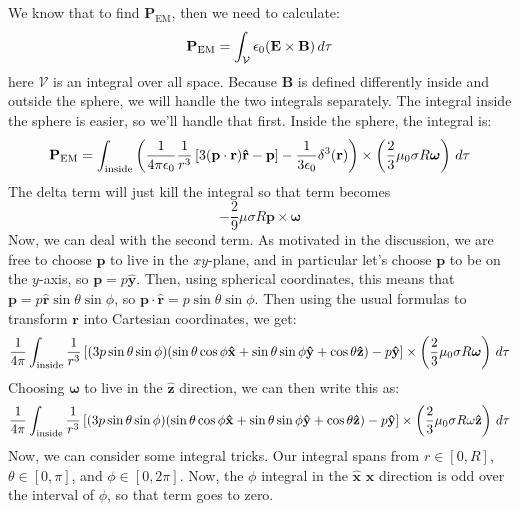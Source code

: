 \documentclass[10pt]{article}
\begin{document}
	\begin{solution}
		We know that to find \( \mathbf{P}_\text{EM} \), then we need to calculate:
		\[
			\mathbf{P}_\text{EM} = \int_\mathcal{V} \epsilon_0(\mathbf{E} \times \mathbf{B}) \,d \tau
		\]
		here \( \mathcal{V} \) is an integral over all space. Because \( \mathbf{B} \) is defined differently
		inside and outside the sphere, we will handle the two integrals separately. The integral inside the
		sphere is easier, so we'll handle that first. Inside the sphere, the integral is:
		\[
			\mathbf{P}_\text{EM} = \int_{\text{inside}} \left( \frac{1}{4 \pi \epsilon_0} \frac{1}{r^3}
			\left[ 3 (\mathbf{p} \cdot \mathbf{r}) \mathbf{\hat{r}} - \mathbf{p} \right] - \frac{1}{3
		\epsilon_0} \delta^3(\mathbf{r}) \right) \times \left( \frac{2}{3} \mu_0 \sigma R \boldsymbol{\omega} \right)
		\,d \tau 
		\]
		The delta term will just kill the integral so that term becomes
		\[
			-\frac{2}{9} \mu \sigma R \mathbf{p} \times \boldsymbol{\omega}
		\]
		Now, we can deal with the second term. As motivated in the discussion, we are free to choose \(
		\mathbf{p} \) to live in the \( xy \)-plane, and in particular let's choose \( \mathbf{p} \) to be on
		the \( y \)-axis, so \( \mathbf{p} = p \mathbf{\hat{y}} \). Then, using spherical coordinates, this
		means that \( \mathbf{p} = p \mathbf{\hat{r}} \sin \theta \sin \phi \), so \( \mathbf{p} \cdot
		\mathbf{\hat{r}} = p \sin \theta \sin \phi \). Then using the usual formulas to transform 
		\( \mathbf{r} \) into Cartesian coordinates, we get:
		\[
			\frac{1}{4\pi} \int_\text{inside} \frac{1}{r^3}\left[ (3 p \sin \theta \sin \phi) (\sin \theta
			\cos \phi \mathbf{\hat{x}} + \sin \theta \sin \phi \mathbf{\hat{y}} + \cos \theta
		\mathbf{\hat{z}}) - p \mathbf{\hat{y}} \right] \times \left( \frac{2}{3}\mu_0 \sigma R
	\boldsymbol{\omega} \right) \,d \tau 
		\]
		Choosing \( \boldsymbol{\omega} \) to live in the \( \mathbf{\hat{z}} \) direction, we can then write
		this as:
		\[
			\frac{1}{4\pi} \int_\text{inside} \frac{1}{r^3}\left[ (3 p \sin \theta \sin \phi) (\sin \theta
			\cos \phi \mathbf{\hat{x}} + \sin \theta \sin \phi \mathbf{\hat{y}} + \cos \theta
		\mathbf{\hat{z}}) - p \mathbf{\hat{y}} \right] \times \left( \frac{2}{3}\mu_0 \sigma R
	\omega \mathbf{\hat{z}}\right) \,d \tau 
		\]
		Now, we can consider some integral tricks. Our integral spans from \( r \in [0, R] \), \( \theta \in
		[0, \pi]\), and \( \phi \in [0, 2\pi] \). Now, the \( \phi \) integral in the \( \mathbf{\hat{x}} \) 
		\( \mathbf{\hat{x}} \) direction is odd over the interval of \( \phi \), so that term goes to zero.

\end{solution}
\end{document}
